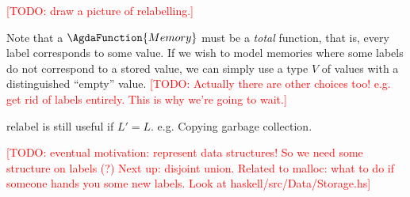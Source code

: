\documentclass{jfp1}
\newcommand{\todo}[1]{\textcolor{red}{[TODO: #1]}}
\newcommand{\todo}[1]{}
\begin{document}

\todo{draw a picture of relabelling.}

Note that a $\AgdaFunction{Memory}$ must be a \emph{total} function,
that is, every label corresponds to some value.  If we wish to model
memories where some labels do not correspond to a stored value, we can
simply use a type $V$ of values with a distinguished ``empty'' value.
\todo{Actually there are other choices too!  e.g. get rid of labels
  entirely.  This is why we're going to wait.}

\begin{commentary}
  relabel is still useful if $L' = L$.  e.g. Copying garbage collection.
\end{commentary}

\todo{eventual motivation: represent data structures!  So we need some
structure on labels (?)  Next up: disjoint union.  Related to malloc:
what to do if someone hands you some new labels.  Look at haskell/src/Data/Storage.hs}
\end{document}
